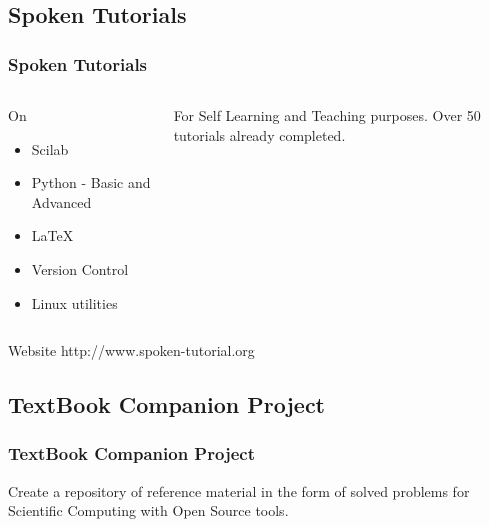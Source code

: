 \documentclass[compress,red]{beamer} %
\begin{document}
\subsection{Spoken Tutorials}
\begin{frame}
\frametitle{Spoken Tutorials}
\begin{columns}
\begin{block}{On}
\begin{itemize}
\item Scilab
\item Python - Basic and Advanced
\item \LaTeX
\item Version Control
\item Linux utilities
\end{itemize}
\end{block}
\begin{block}{For}
Self Learning and Teaching purposes.
Over \alert{50} tutorials already completed.
\end{block}
\pause
\end{columns}
\begin{block}{Website}
http://www.spoken-tutorial.org
\end{block}
\end{frame}


\subsection{TextBook Companion Project}

\begin{frame}
\frametitle{TextBook Companion Project}
\begin{description}
Create a repository of reference material in the form of solved problems for Scientific Computing with Open Source tools.
\end{description}
\end{frame}


\section*{}
\end{document}
